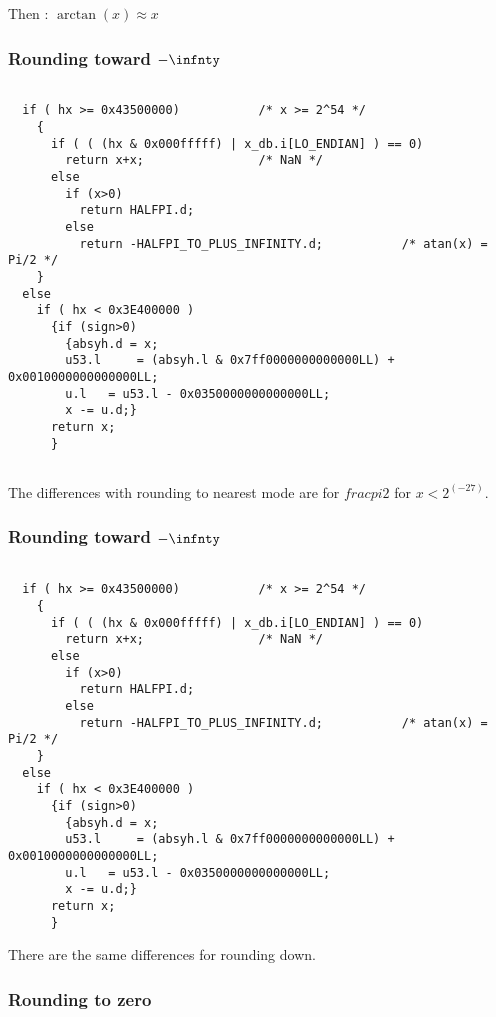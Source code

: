 Then : $\arctan(x) \approx x $
\bigskip

\subsubsection{Rounding toward $-\infnty$}
\begin{lstlisting}[caption={Exceptional cases : rounding up},firstnumber=1]

  if ( hx >= 0x43500000)           /* x >= 2^54 */
    {
      if ( ( (hx & 0x000fffff) | x_db.i[LO_ENDIAN] ) == 0)
        return x+x;                /* NaN */
      else
        if (x>0)
          return HALFPI.d;
        else
          return -HALFPI_TO_PLUS_INFINITY.d;           /* atan(x) = Pi/2 */
    }
  else
    if ( hx < 0x3E400000 )
      {if (sign>0)
        {absyh.d = x;
        u53.l     = (absyh.l & 0x7ff0000000000000LL) +  0x0010000000000000LL;
        u.l   = u53.l - 0x0350000000000000LL;
        x -= u.d;}
      return x;
      }
  
\end{lstlisting}

The differences with rounding to nearest mode are for $frac{pi}{2}$ for
$x<2^(-27)$.

\subsubsection{Rounding toward $-\infnty$}

\begin{lstlisting}[caption={Exceptional cases : rounding up},firstnumber=1]

  if ( hx >= 0x43500000)           /* x >= 2^54 */
    {
      if ( ( (hx & 0x000fffff) | x_db.i[LO_ENDIAN] ) == 0)
        return x+x;                /* NaN */
      else
        if (x>0)
          return HALFPI.d;
        else
          return -HALFPI_TO_PLUS_INFINITY.d;           /* atan(x) = Pi/2 */
    }
  else
    if ( hx < 0x3E400000 )
      {if (sign>0)
        {absyh.d = x;
        u53.l     = (absyh.l & 0x7ff0000000000000LL) +  0x0010000000000000LL;
        u.l   = u53.l - 0x0350000000000000LL;
        x -= u.d;}
      return x;
      }

\end{lstlisting}

There are the same differences for rounding down.

\subsubsection{Rounding to zero}

